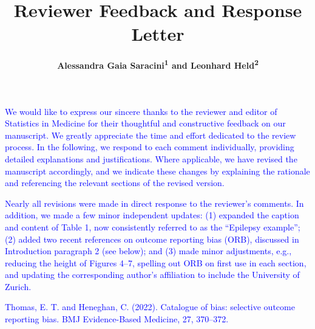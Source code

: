 \documentclass{article}
\date{}
\begin{document}
\title{ \huge{\textbf{Reviewer Feedback and Response Letter}}\\[0.5em]
}

\author{\textbf{Alessandra Gaia Saracini\textsuperscript{1} and Leonhard Held\textsuperscript{2}}}


\maketitle


\textcolor{blue}{
We would like to express our sincere thanks to the reviewer and editor of Statistics in Medicine for their thoughtful and constructive feedback on our manuscript. We greatly appreciate the time and effort dedicated to the review process. In the following, we respond to each comment individually, providing detailed explanations and justifications. Where applicable, we have revised the manuscript accordingly, and we indicate these changes by explaining the rationale and referencing the relevant sections of the revised version.}

\bigskip

\textcolor{blue}{
Nearly all revisions were made in direct response to the reviewer’s comments. In addition, we made a few minor independent updates: (1) expanded the caption and content of Table 1, now consistently referred to as the “Epilepsy example”; (2) added two recent references on outcome reporting bias (ORB), discussed in Introduction paragraph 2 (see below); and (3) made minor adjustments, e.g., reducing the height of Figures 4–7, spelling out ORB on first use in each section, and updating the corresponding author's affiliation to include the University of Zurich.}

\bigskip

\textcolor{blue}{Thomas, E. T. and Heneghan, C. (2022). Catalogue of bias: selective outcome reporting bias. BMJ Evidence-Based Medicine, 27, 370–372.}
\end{document}
